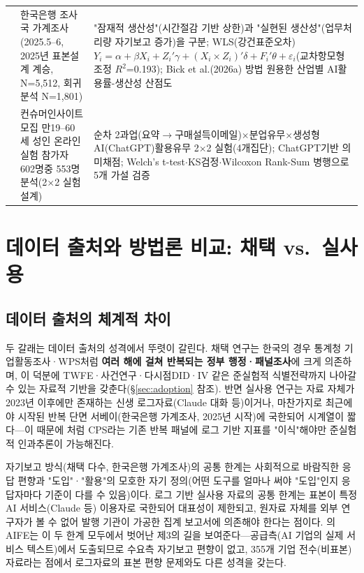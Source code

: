 \documentclass[11pt]{article}
\begin{document}
\begin{longtable}{L{2.5cm}L{6.4cm}L{6.4cm}}
\citet{bok-2026-ai-adoption-productivity-effects} &
한국은행 조사국 가계조사(2025.5--6, 2025년 표본설계 계승, N=5,512, 회귀분석 N=1,801) &
"잠재적 생산성"(시간절감 기반 상한)과 "실현된 생산성"(업무처리량 자기보고 증가)을 구분; WLS(강건표준오차) $Y_i=\alpha+\beta X_i+Z_i'\gamma+(X_i\times Z_i)'\delta+F_i'\theta+\varepsilon_i$(교차항모형 조정 $R^2$=0.193); Bick et al.(2026a) 방법 원용한 산업별 AI활용률-생산성 산점도\\

\citet{min-2025-productivity-gains-generative-ai} &
컨슈머인사이트 모집 만19--60세 성인 온라인실험 참가자 602명중 553명 분석(2$\times$2 실험설계) &
순차 2과업(요약$\to$구매설득이메일)$\times$분업유무$\times$생성형AI(ChatGPT)활용유무 2$\times$2 실험(4개집단); ChatGPT기반 의미채점; Welch's t-test$\cdot$KS검정$\cdot$Wilcoxon Rank-Sum 병행으로 5개 가설 검증\\
\end{longtable}

\section{데이터 출처와 방법론 비교: 채택 vs.\ 실사용}
\label{sec:compare}

\subsection{데이터 출처의 체계적 차이}

두 갈래는 데이터 출처의 성격에서 뚜렷이 갈린다. 채택 연구는 한국의 경우 통계청 기업활동조사·WPS처럼 \textbf{여러 해에 걸쳐 반복되는 정부 행정·패널조사}에 크게 의존하며, 이 덕분에 TWFE·사건연구·다시점DID·IV 같은 준실험적 식별전략까지 나아갈 수 있는 자료적 기반을 갖춘다(\S\ref{sec:adoption} 참조). 반면 실사용 연구는 자료 자체가 2023년 이후에만 존재하는 신생 로그자료(Claude 대화 등)이거나, 마찬가지로 최근에야 시작된 반복 단면 서베이(한국은행 가계조사, 2025년 시작)에 국한되어 시계열이 짧다—이 때문에 \citet{massenkoff-2026-labor-market-impacts-of-ai}처럼 CPS라는 기존 반복 패널에 로그 기반 지표를 "이식"해야만 준실험적 인과추론이 가능해진다.

자기보고 방식(채택 다수, 한국은행 가계조사)의 공통 한계는 사회적으로 바람직한 응답 편향과 "도입"·"활용"의 모호한 자기 정의(어떤 도구를 얼마나 써야 "도입"인지 응답자마다 기준이 다를 수 있음)이다. 로그 기반 실사용 자료의 공통 한계는 표본이 특정 AI 서비스(Claude 등) 이용자로 국한되어 대표성이 제한되고, 원자료 자체를 외부 연구자가 볼 수 없어 발행 기관이 가공한 집계 보고서에 의존해야 한다는 점이다. \citet{cheon-2025-ai-exposure-vs-ai-adoption}의 AIFE는 이 두 한계 모두에서 벗어난 제3의 길을 보여준다—공급측(AI 기업의 실제 서비스 텍스트)에서 도출되므로 수요측 자기보고 편향이 없고, 355개 기업 전수(비표본) 자료라는 점에서 로그자료의 표본 편향 문제와도 다른 성격을 갖는다.
\end{document}
